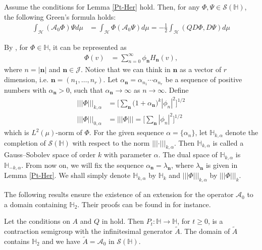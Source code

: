 \documentclass[review, onefignum, onetabnum]{siamart171218}
\begin{document}
\begin{lemma}
    Assume the conditions for Lemma \ref{Pt-Her} hold. Then, for any 
    $\Phi,\Psi\in \mathcal{S}(\mathbb{H})$, the following Green’s formula holds:
    \begin{align}
         \int_{\mathcal{H}} (\mathcal{A}_0 \Phi)\Psi d\mu &=
             \int_{\mathcal{H}} \Phi(\mathcal{A}_0 \Psi) d\mu=
            -\frac{1}{2}\int_{\mathcal{H}} (QD\Phi, D\Psi) d\mu
    \end{align}
    
\end{lemma}
By , for $\Phi \in \mathbb{H}$, it can be represented as
\begin{align} \label{s1.4}
    \Phi(v) &= 
        \sum_{n=0}^\infty \phi_{\mathbf{n}} H_{\mathbf{n}}(v), 
\end{align}
where $n = |\mathbf{n}|$ and $\mathbf{n}\in \mathcal{J}$. Notice that we can 
think in $\mathbf{n}$ as a vector of $r$ dimension, i.e. 
$\mathbf{n}=(n_1,\ldots,n_r)$. 
Let $\alpha_{\mathbf{n}} = \alpha_{n_1}\cdots \alpha_{n_r}$ be a sequence of
positive numbers with $\alpha_{\mathbf{n}} > 0$, such that 
$\alpha_{\mathbf{n}} \rightarrow \infty$ as $n \rightarrow \infty$. 
Define
\begin{align*}
     |||\Phi|||_{k,\alpha} &= \Bigg[ \sum_{\mathbf{n}} 
    \big(1+\alpha_{\mathbf{n}}\big)^k |\phi_n|^2 \Bigg]^{1/2}\nonumber\\
    |||\Phi|||_{0,\alpha} &= |||\Phi|||=\Bigg[ \sum_{\mathbf{n}} |\phi_n|^2 
    \Bigg]^{1/2}
\end{align*}
which is $L^2(\mu)$-norm of $\Phi$. For the given sequence 
$\alpha = \{\alpha_n \}$, let $\mathbb{H}_{k,\alpha}$ denote
the completion of $\mathcal{S}(\mathbb{H})$ with respect to the norm 
$|||\cdot|||_{k,\alpha}$. Then $\mathbb{H}_{k,\alpha}$ is called
a Gauss–Sobolev space of order $k$ with parameter $\alpha$. The dual space of 
$\mathbb{H}_{k,\alpha}$ is $\mathbb{H}_{-k,\alpha}$.
From now on, we will fix the sequence $\alpha_{\mathbf{n}} = 
\lambda_{\mathbf{n}} $, where $\lambda_{\mathbf{n}} $ is given in Lemma 
\ref{Pt-Her}.
We shall simply denote $\mathbb{H}_{k,\alpha}$ by $\mathbb{H}_{k}$ and 
$ |||\Phi|||_{k,\alpha}$ by $|||\Phi|||_{k}$.

The following results ensure the existence of an extension for the operator 
$\mathcal{A}_0$ to a domain containing $\mathbb{H}_{2}$. Their 
proofs can be found in \cite{liu} for instance.

\begin{theorem}\label{the-Pt-A}
    Let the conditions on $A$ and $Q$ in  hold. 
    Then \sloppy ${P_t: \mathbb{H}\rightarrow \mathbb{H}}$, for $t \ge 0$, is a 
    contraction semigroup with the infinitesimal generator $\tilde{A}$. 
    The domain of $\tilde{A}$ contains $\mathbb{H}_{2}$ and we have 
    $\tilde{A} =\mathcal{A}_0 $ in $\mathcal{S}(\mathbb{H})$.
    
\end{theorem}
\end{document}
